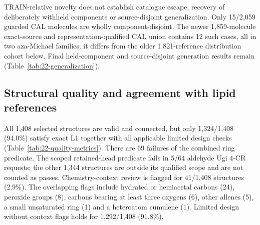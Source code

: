 TRAIN-relative novelty does not establish catalogue escape, recovery of deliberately withheld
components or source-disjoint generalization. Only 15/2,059 guarded CAL molecules are wholly
component-disjoint. The newer 1,859-molecule exact-source and representation-qualified CAL union
contains 12 such cases, all in two aza-Michael families; it differs from the older 1,821-reference
distribution cohort below. Final held-component and source-disjoint generation results remain
 (Table~\ref{tab:22-generalization}).

\subsection{Structural quality and agreement with lipid references}
All 1,408 selected structures are valid and connected, but only 1,324/1,408 (94.0\%) satisfy exact
L1 together with all applicable limited design checks (Table~\ref{tab:22-quality-metrics}).
There are 69 failures of the combined ring predicate. The scoped retained-head predicate fails in
5/64 aldehyde Ugi 4-CR requests; the other 1,344 structures are outside its qualified scope and
are not counted as passes. Chemistry-context review is flagged for 41/1,408 structures (2.9\%).
The overlapping flags include hydrated or hemiacetal carbons (24), peroxide groups (8), carbons
bearing at least three oxygens (6), other allenes (5), a small unsaturated ring (1) and a heteroatom
cumulene (1). Limited design without context flags holds for 1,292/1,408 (91.8\%).

